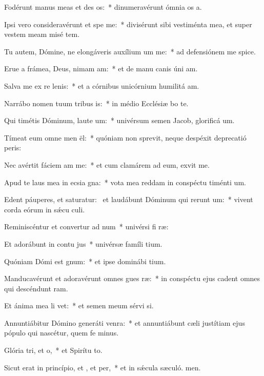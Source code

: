 \item Fodérunt manus meas et des os:~* dinumeravérunt ómnia os a.
\item Ipsi vero consideravérunt et spe me:~* divisérunt sibi vestiménta mea, et super vestem meam misé tem.
\item Tu autem, Dómine, ne elongáveris auxílium um  me:~* ad defensiónem me spice.
\item Erue a frámea, Deus, nimam am:~* et de manu canis úni am.
\item Salva me ex re lenis:~* et a córnibus unicórnium humilitá am.
\item Narrábo nomen tuum tribus is:~* in médio Ecclésiæ bo te.
\item Qui timétis Dóminum, laute um:~* univérsum semen Jacob, glorificá um.
\item Tímeat eum omne men ël:~* quóniam non sprevit, neque despéxit deprecatió peris:
\item Nec avértit fáciem am  me:~* et cum clamárem ad eum, exvit me.
\item Apud te laus mea in ecsia gna:~* vota mea reddam in conspéctu timénti um.
\item Edent páuperes, et saturatur:~\pscross{} et laudábunt Dóminum qui rerunt um:~* vivent corda eórum in sǽcu culi.
\item Reminiscéntur et convertur ad num~* univérsi fi ræ:
\item Et adorábunt in contu jus~* univérsæ famíli tium.
\item Quóniam Dómi est gnum:~* et ipse dominábi tium.
\item Manducavérunt et adoravérunt omnes gues ræ:~* in conspéctu ejus cadent omnes qui descéndunt  ram.
\item Et ánima mea li vet:~* et semen meum sérvi si.
\item Annuntiábitur Dómino generáti venra:~* et annuntiábunt cæli justítiam ejus pópulo qui nascétur, quem fe minus.
\item Glória tri, et o,~* et Spirítu to.
\item Sicut erat in princípio, et , et per,~* et in sǽcula sæculó. men.
